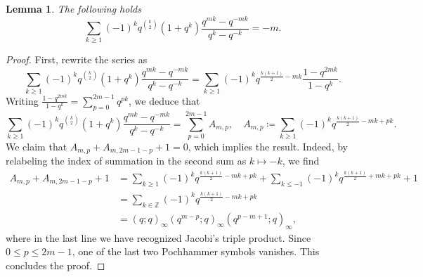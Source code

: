 \documentclass[a4paper,11pt,english]{article}
\theoremstyle{plain}
\newtheorem{lemma}[theorem]{Lemma}
\theoremstyle{definition}
\theoremstyle{plain}
\newcommand{\Z}{\mathbb{Z}}
\begin{document}
\begin{lemma}
	The following holds
	\begin{equation}
		\label{eq:vanishing:even}
		\sum_{k \ge 1}
		(-1)^{k}
		q^{\binom{k}{2}} (1 + q^k)
			\frac{q^{mk} - q^{-mk}}{q^k - q^{-k}}
		=
		- m.
	\end{equation}
\end{lemma}

\begin{proof}
    First, rewrite the series as
	\begin{equation}
		\sum_{k \ge 1}
		(-1)^{k}
		q^{\binom{k}{2}} (1 + q^k)
			\frac{q^{mk} - q^{-mk}}{q^k - q^{-k}}
		=
		\sum_{k \ge 1}
			  (-1)^{k}
			q^{\frac{k(k+1)}{2} - mk}
			  \frac{1 - q^{2mk}}{1 - q^k} .
	\end{equation}
	Writing $\frac{1 - q^{2mk}}{1 - q^k} = \sum_{p = 0}^{2m-1} q^{pk}$, we deduce that
	\begin{equation}
		\sum_{k \ge 1}
		(-1)^{k}
		q^{\binom{k}{2}} (1 + q^k)
			\frac{q^{mk} - q^{-mk}}{q^k - q^{-k}}
		=
		\sum_{p = 0}^{2m-1} A_{m,p},
		\quad
		A_{m,p}
		\coloneqq
		\sum_{k \ge 1}
			  (-1)^{k}
			q^{\frac{k(k+1)}{2} - mk + pk}.
	\end{equation}
	We claim that $A_{m,p} + A_{m,2m-1-p} + 1 = 0$, which implies the result. Indeed, by relabeling the index of summation in the second sum as $k \mapsto -k$, we find
	\begin{equation}
	\begin{split}
		A_{m,p} + A_{m,2m-1-p} + 1
		&=
		\sum_{k \ge 1}
			  (-1)^{k}
			q^{\frac{k(k+1)}{2} - mk + pk}
		+
		\sum_{k \le -1}
			  (-1)^{k}
			q^{\frac{k(k+1)}{2} + mk + pk}
		+ 1 \\
		&=
		\sum_{k \in \Z}
			  (-1)^{k}
			q^{\frac{k(k+1)}{2} - mk + pk} \\
		&=
		(q;q)_{\infty} (q^{m-p};q)_{\infty} (q^{p-m+1};q)_{\infty},
	\end{split}
	\end{equation}
	where in the last line we have recognized Jacobi's triple product. Since $0 \le p \le 2m-1$, one of the last two Pochhammer symbols vanishes. This concludes the proof.
\end{proof}



\end{document}
